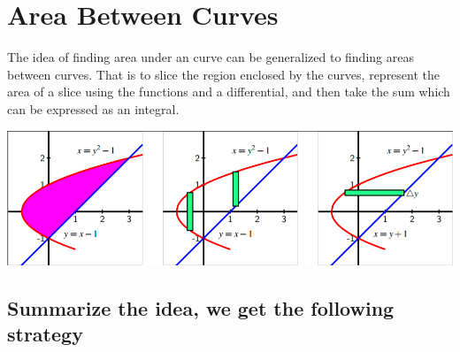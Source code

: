 
\hypertarget{area-between-curves}{%
\section{Area Between Curves}\label{area-between-curves}}

The idea of finding area under an curve can be generalized to finding
areas between curves. That is to slice the region enclosed by the
curves, represent the area of a slice using the functions and a
differential, and then take the sum which can be expressed as an
integral.

\begin{fullwidth}
  \centering
  \includegraphics[width=0.8\linewidth]{img/image-20200506101055076.png}
\end{fullwidth}

\hypertarget{summarize-the-idea-we-get-the-following-strategy}{%
\subsection{Summarize the idea, we get the following
strategy}\label{summarize-the-idea-we-get-the-following-strategy}}

